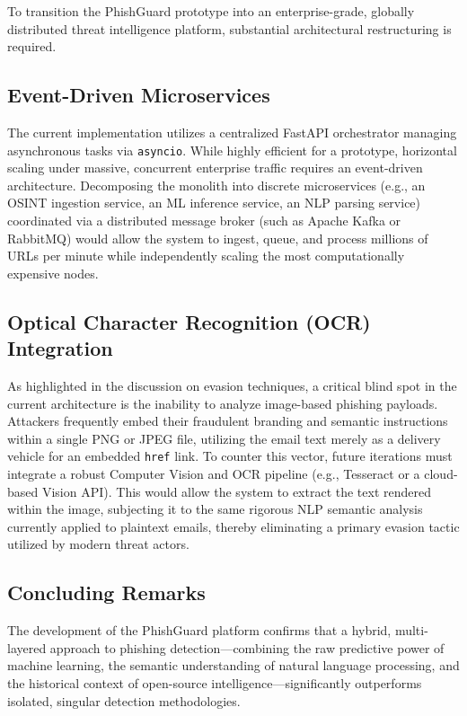 To transition the PhishGuard prototype into an enterprise-grade,
globally distributed threat intelligence platform, substantial
architectural restructuring is required.

\subsection{Event-Driven
Microservices}\label{event-driven-microservices}

The current implementation utilizes a centralized FastAPI orchestrator
managing asynchronous tasks via \texttt{asyncio}. While highly efficient
for a prototype, horizontal scaling under massive, concurrent enterprise
traffic requires an event-driven architecture. Decomposing the monolith
into discrete microservices (e.g., an OSINT ingestion service, an ML
inference service, an NLP parsing service) coordinated via a distributed
message broker (such as Apache Kafka or RabbitMQ) would allow the system
to ingest, queue, and process millions of URLs per minute while
independently scaling the most computationally expensive nodes.

\subsection{Optical Character Recognition (OCR)
Integration}\label{optical-character-recognition-ocr-integration}

As highlighted in the discussion on evasion techniques, a critical blind
spot in the current architecture is the inability to analyze image-based
phishing payloads. Attackers frequently embed their fraudulent branding
and semantic instructions within a single PNG or JPEG file, utilizing
the email text merely as a delivery vehicle for an embedded
\texttt{href} link. To counter this vector, future iterations must
integrate a robust Computer Vision and OCR pipeline (e.g., Tesseract or
a cloud-based Vision API). This would allow the system to extract the
text rendered within the image, subjecting it to the same rigorous NLP
semantic analysis currently applied to plaintext emails, thereby
eliminating a primary evasion tactic utilized by modern threat actors.

\subsection{Concluding Remarks}\label{concluding-remarks}

The development of the PhishGuard platform confirms that a hybrid,
multi-layered approach to phishing detection---combining the raw
predictive power of machine learning, the semantic understanding of
natural language processing, and the historical context of open-source
intelligence---significantly outperforms isolated, singular detection
methodologies.

